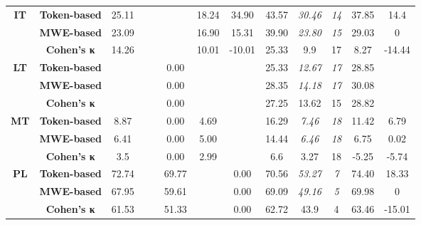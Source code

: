 \documentclass[output=paper,modfonts,nonflat,draftmode]{langsci/langscibook}
\begin{document}
\begin{table}
{\begin{tabular}{ccccccccccccc}
\textbf{\scriptsize{}IT} & \textbf{\scriptsize{}Token-based} & {\scriptsize{}25.11} &  &  &  & {\scriptsize{}18.24} & {\scriptsize{}34.90} & {\scriptsize{}43.57} & \emph{\scriptsize{}30.46} & \textit{\scriptsize{}14} & {\scriptsize{}37.85} & {\scriptsize{}14.4}\tabularnewline
 & \textbf{\scriptsize{}MWE-based} & {\scriptsize{}23.09} &  &  &  & {\scriptsize{}16.90} & {\scriptsize{}15.31} & {\scriptsize{}39.90} & \emph{\scriptsize{}23.80} & \textit{\scriptsize{}15} & {\scriptsize{}29.03} & {\scriptsize{}0}\tabularnewline
   & \textbf{\scriptsize{}Cohen's κ} &\scriptsize{14.26}  &\scriptsize{}  &\scriptsize{}  & \scriptsize{} &\scriptsize{10.01}  &\scriptsize{-10.01}  &\scriptsize{25.33} &\scriptsize{9.9}  &\scriptsize{17} & \scriptsize{8.27} &\scriptsize{-14.44}  \tabularnewline
\midrule 

\textbf{\scriptsize{}LT} & \textbf{\scriptsize{}Token-based} &  &  &  & {\scriptsize{}0.00} &  &  & {\scriptsize{}25.33} & \emph{\scriptsize{}12.67} & \textit{\scriptsize{}17} & {\scriptsize{}28.85} & \tabularnewline
 & \textbf{\scriptsize{}MWE-based} &  &  &  & {\scriptsize{}0.00} &  &  & {\scriptsize{}28.35} & \emph{\scriptsize{}14.18} & \textit{\scriptsize{}17} & {\scriptsize{}30.08} & \tabularnewline
   & \textbf{\scriptsize{}Cohen's κ} &\scriptsize{}  &\scriptsize{}  &\scriptsize{}  & \scriptsize{0.00} &\scriptsize{}  &\scriptsize{}  &\scriptsize{27.25} &\scriptsize{13.62}  &\scriptsize{15} & \scriptsize{28.82} &\scriptsize{}  \tabularnewline
\midrule 

\textbf{\scriptsize{}MT} & \textbf{\scriptsize{}Token-based} & {\scriptsize{}8.87} &  &  & {\scriptsize{}0.00} & {\scriptsize{}4.69} &  & {\scriptsize{}16.29} & \emph{\scriptsize{}7.46} & \textit{\scriptsize{}18} & {\scriptsize{}11.42} & {\scriptsize{}6.79}\tabularnewline
 & \textbf{\scriptsize{}MWE-based} & {\scriptsize{}6.41} &  &  & {\scriptsize{}0.00} & {\scriptsize{}5.00} &  & {\scriptsize{}14.44} & \emph{\scriptsize{}6.46} & \textit{\scriptsize{}18} & {\scriptsize{}6.75} & {\scriptsize{}0.02}\tabularnewline
   & \textbf{\scriptsize{}Cohen's κ} &\scriptsize{3.5}  &\scriptsize{}  &\scriptsize{}  & \scriptsize{0.00} &\scriptsize{2.99}  &\scriptsize{}  &\scriptsize{6.6} &\scriptsize{3.27}  &\scriptsize{18} & \scriptsize{-5.25} &\scriptsize{-5.74}  \tabularnewline
\midrule 

\textbf{\scriptsize{}PL} & \textbf{\scriptsize{}Token-based} & {\scriptsize{}72.74} &  &  & {\scriptsize{}69.77} &  & {\scriptsize{}0.00} & {\scriptsize{}70.56} & \emph{\scriptsize{}53.27} & \textit{\scriptsize{}7} & {\scriptsize{}74.40} & {\scriptsize{}18.33}\tabularnewline
 & \textbf{\scriptsize{}MWE-based} & {\scriptsize{}67.95} &  &  & {\scriptsize{}59.61} &  & {\scriptsize{}0.00} & {\scriptsize{}69.09} & \emph{\scriptsize{}49.16} & \textit{\scriptsize{}5} & {\scriptsize{}69.98} & {\scriptsize{}0}\tabularnewline
   & \textbf{\scriptsize{}Cohen's κ} &\scriptsize{61.53}  &\scriptsize{}  &\scriptsize{}  & \scriptsize{51.33} &\scriptsize{}  &\scriptsize{0.00}  &\scriptsize{62.72} &\scriptsize{43.9}  &\scriptsize{4} & \scriptsize{63.46} &\scriptsize{-15.01} \tabularnewline
\midrule 


\end{tabular}}
\end{table}
\end{document}
